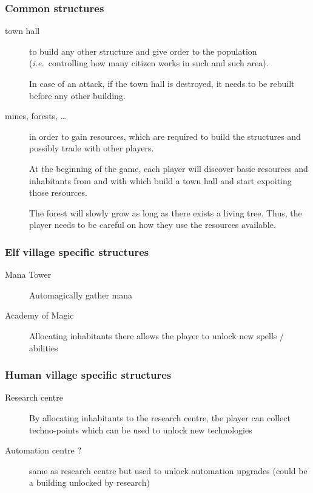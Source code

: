 \documentclass{article}
\def\ie{\textit{i.e.}}
\begin{document}
\subsubsection{Common structures}
\begin{description}
    \item[town hall] to build any other structure and give order to the population (\ie~controlling
    how many citizen works in such and such area).

    In case of an attack, if the town hall is destroyed, it needs to be rebuilt before any other
    building.

    \item[mines, forests, \dots] in order to gain resources, which are required to build the
    structures and possibly trade with other players.

    At the beginning of the game, each player will discover basic resources and inhabitants from
    and with which build a town hall and start expoiting those resources.

    \medskip
    The forest will slowly grow as long as there exists a living tree. Thus, the player needs to
    be careful on how they use the resources available.
\end{description}

\subsubsection{Elf village specific structures}
\begin{description}
    \item[Mana Tower] Automagically gather mana
    \item[Academy of Magic]  Allocating inhabitants there allows the player to unlock new spells / abilities
\end{description}
\subsubsection{Human village specific structures}
\begin{description}
    \item[Research centre] By allocating inhabitants to the research centre, the player can collect
    techno-points which can be used to unlock new technologies
    \item[Automation centre ?] same as research centre but used to unlock automation upgrades (could be a building unlocked by research)
\end{description}
\end{document}
